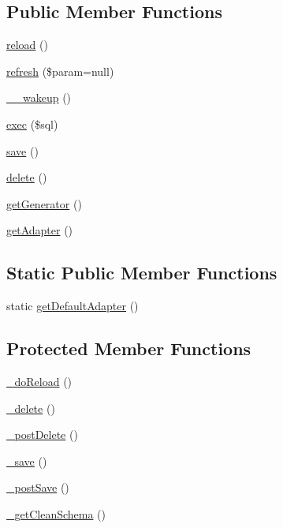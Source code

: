 \subsection*{Public Member Functions}
\begin{DoxyCompactItemize}
\item 
\hyperlink{classZendDbSchema__Db__Schema__AbstractEntity_aa35a80275bd3c811dd8ad39835a985a9}{reload} ()
\item 
\hyperlink{classZendDbSchema__Db__Schema__AbstractEntity_abee9675e11d86dace1abed3d94a0fda1}{refresh} (\$param=null)
\item 
\hyperlink{classZendDbSchema__Db__Schema__AbstractEntity_ad92ca2449257a587b336367f109cdde2}{\-\_\-\-\_\-wakeup} ()
\item 
\hyperlink{classZendDbSchema__Db__Schema__AbstractEntity_a7ddb87869e3021260c12bb57df4ba8c1}{exec} (\$sql)
\item 
\hyperlink{classZendDbSchema__Db__Schema__AbstractEntity_a5b1c93da76c3708f90d330b4643e55b2}{save} ()
\item 
\hyperlink{classZendDbSchema__Db__Schema__AbstractEntity_a26fcff2268495fcdbfa265f394ee93d9}{delete} ()
\item 
\hyperlink{classZendDbSchema__Db__Schema__AbstractEntity_a72a4acb81535f7110a49dfb3755ac48b}{get\-Generator} ()
\item 
\hyperlink{classZendDbSchema__Db__Schema__AbstractEntity_ad6dfc39cc6d92633fd92170db18c9573}{get\-Adapter} ()
\end{DoxyCompactItemize}
\subsection*{Static Public Member Functions}
\begin{DoxyCompactItemize}
\item 
static \hyperlink{classZendDbSchema__Db__Schema__AbstractEntity_aeeb617d5d385796ccbe95e0aa85cf491}{get\-Default\-Adapter} ()
\end{DoxyCompactItemize}
\subsection*{Protected Member Functions}
\begin{DoxyCompactItemize}
\item 
\hyperlink{classZendDbSchema__Db__Schema__AbstractEntity_ab317ba1e66cc14d78922314962f7d0ff}{\-\_\-do\-Reload} ()
\item 
\hyperlink{classZendDbSchema__Db__Schema__AbstractEntity_a3aee3f3f8c86d17aeba34b520c0c407d}{\-\_\-delete} ()
\item 
\hyperlink{classZendDbSchema__Db__Schema__AbstractEntity_a29b327cec2bd92fcdaecd4854c72efd7}{\-\_\-post\-Delete} ()
\item 
\hyperlink{classZendDbSchema__Db__Schema__AbstractEntity_a453f0e0a50f718a89f7f024e61a3e2c2}{\-\_\-save} ()
\item 
\hyperlink{classZendDbSchema__Db__Schema__AbstractEntity_af43e389f058e86574090ef18a335e4ce}{\-\_\-post\-Save} ()
\item 
\hyperlink{classZendDbSchema__Db__Schema__AbstractEntity_af7158a6eb788024abc42ba131bc7a8f1}{\-\_\-get\-Clean\-Schema} ()
\end{DoxyCompactItemize}
